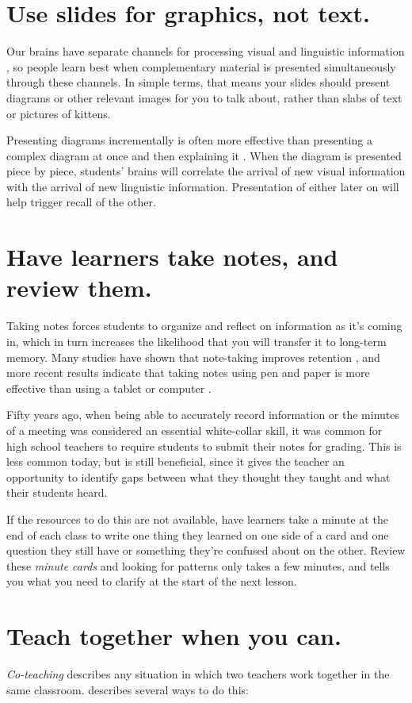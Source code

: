 \documentclass[10pt,letterpaper]{article}
\newcommand{\rulemajor}[1]{\section{#1}}
\begin{document}
\rulemajor{Use slides for graphics, not text.}

Our brains have separate channels for
processing visual and linguistic information \cite{Ambr2010,HPL2},
so people learn best when complementary material is presented simultaneously through these channels.
In simple terms,
that means your slides should present diagrams or other relevant images for you to talk about,
rather than slabs of text or pictures of kittens.

Presenting diagrams incrementally is often more effective than
presenting a complex diagram at once and then explaining it \cite{Maye2003,Maye2009}.
When the diagram is presented piece by piece,
students' brains will correlate the arrival of new visual information
with the arrival of new linguistic information.
Presentation of either later on will help trigger recall of the other.

\rulemajor{Have learners take notes, and review them.}

Taking notes forces students to organize and reflect on information as it's coming in,
which in turn increases the likelihood that you will transfer it to long-term memory.
Many studies have shown that note-taking improves retention \cite{Aike1975,Boha2011},
and more recent results indicate that taking notes using pen and paper
is more effective than using a tablet or computer \cite{Muel2014}.

Fifty years ago,
when being able to accurately record information or the minutes of a meeting
was considered an essential white-collar skill,
it was common for high school teachers to require students to submit their notes for grading.
This is less common today,
but is still beneficial,
since it gives the teacher an opportunity to identify gaps between
what they thought they taught
and what their students heard.

If the resources to do this are not available,
have learners take a minute at the end of each class
to write one thing they learned on one side of a card
and one question they still have or something they're confused about on the other.
Review these \emph{minute cards} and looking for patterns only takes a few minutes,
and tells you what you need to clarify at the start of the next lesson.

\rulemajor{Teach together when you can.}

\emph{Co-teaching} describes any situation
in which two teachers work together in the same classroom.
\cite{Frie2016} describes several ways to do this:
\end{document}

